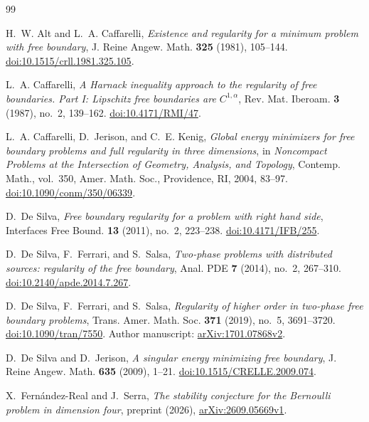 \clearpage
{}
\begin{thebibliography}{99}

H.~W. Alt and L.~A. Caffarelli,
\emph{Existence and regularity for a minimum problem with free boundary},
J. Reine Angew. Math. \textbf{325} (1981), 105--144.
\href{https://doi.org/10.1515/crll.1981.325.105}{doi:10.1515/crll.1981.325.105}.

L.~A. Caffarelli,
\emph{A Harnack inequality approach to the regularity of free boundaries.
Part I: Lipschitz free boundaries are $C^{1,\alpha}$},
Rev. Mat. Iberoam. \textbf{3} (1987), no.~2, 139--162.
\href{https://doi.org/10.4171/RMI/47}{doi:10.4171/RMI/47}.

L.~A. Caffarelli, D.~Jerison, and C.~E. Kenig,
\emph{Global energy minimizers for free boundary problems and full regularity
in three dimensions},
in \emph{Noncompact Problems at the Intersection of Geometry, Analysis,
and Topology},
Contemp. Math., vol.~350,
Amer. Math. Soc., Providence, RI, 2004, 83--97.
\href{https://doi.org/10.1090/conm/350/06339}{doi:10.1090/conm/350/06339}.

D.~De Silva,
\emph{Free boundary regularity for a problem with right hand side},
Interfaces Free Bound. \textbf{13} (2011), no.~2, 223--238.
\href{https://doi.org/10.4171/IFB/255}{doi:10.4171/IFB/255}.

D.~De Silva, F.~Ferrari, and S.~Salsa,
\emph{Two-phase problems with distributed sources: regularity of the free boundary},
Anal. PDE \textbf{7} (2014), no.~2, 267--310.
\href{https://doi.org/10.2140/apde.2014.7.267}{doi:10.2140/apde.2014.7.267}.

D.~De Silva, F.~Ferrari, and S.~Salsa,
\emph{Regularity of higher order in two-phase free boundary problems},
Trans. Amer. Math. Soc. \textbf{371} (2019), no.~5, 3691--3720.
\href{https://doi.org/10.1090/tran/7550}{doi:10.1090/tran/7550}.
Author manuscript: \href{https://arxiv.org/abs/1701.07868v2}{arXiv:1701.07868v2}.

D.~De Silva and D.~Jerison,
\emph{A singular energy minimizing free boundary},
J. Reine Angew. Math. \textbf{635} (2009), 1--21.
\href{https://doi.org/10.1515/CRELLE.2009.074}{doi:10.1515/CRELLE.2009.074}.

X.~Fern\'andez-Real and J.~Serra,
\emph{The stability conjecture for the Bernoulli problem in dimension four},
preprint (2026),
\href{https://arxiv.org/abs/2609.05669v1}{arXiv:2609.05669v1}.


\end{thebibliography}
